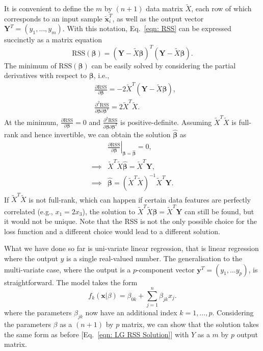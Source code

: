 It is convenient to define the $m$ by $(n+1)$ data matrix $\widetilde{X}$, each row of which corresponds to  an input sample $\bm{\tilde{x}}^{T}_{i}$, as well as the output vector $\bm{Y}^{T} = (y_{1}, \dots, y_{m})$. With this notation, Eq.~\eqref{eqn: RSS} can be expressed succinctly as a matrix equation
\begin{equation}
    \textrm{RSS}(\bm{\beta}) = (\bm{Y} - \widetilde{X}\bm{\beta})^{T}(\bm{Y} - \widetilde{X}\bm{\beta}).
    \end{equation}
The minimum of $\textrm{RSS}(\bm{\beta})$ can be easily solved by considering the partial derivatives with respect to $\bm{\beta}$, i.e.,
\begin{equation}
\begin{split}
  &\frac{\partial \textrm{RSS}}{\partial \bm{\beta}} = -2 \widetilde{X}^{T}(\bm{Y} - \widetilde{X}\bm{\beta}), \\
  &\frac{\partial^{2} \textrm{RSS}}{\partial \bm{\beta}\partial \bm{\beta}^{T}} = 2 \widetilde{X}^{T}\widetilde{X}.
\end{split}
\end{equation}
At the minimum, $\frac{\partial \textrm{RSS}}{\partial \bm{\beta}} = 0$ and $\frac{\partial^{2} \textrm{RSS}}{\partial \bm{\beta}\partial \bm{\beta}^{T}}$ is positive-definite. Assuming $ \widetilde{X}^{T}\widetilde{X}$ is full-rank and hence invertible, we can obtain the solution $\hat{\bm{\beta}}$ as 
\begin{equation}\label{eqn: LG RSS Solution}
\begin{split}
    &\left.\frac{\partial \textrm{RSS}}{\partial \bm{\beta}}\right|_{\bm{\beta}=\hat{\bm{\beta}}} = 0, \\
      \implies &\widetilde{X}^{T}\widetilde{X}\hat{\bm{\beta}} = \widetilde{X}^{T}\bm{Y}, \\
    \implies 
 & \hat{\bm{\beta} }=  (\widetilde{X}^{T}\widetilde{X})^{-1} \widetilde{X}^{T} \bm{Y}.
\end{split}
\end{equation}
If $ \widetilde{X}^{T}\widetilde{X}$ is not full-rank, which can happen if certain data features are perfectly correlated (e.g., $x_1 = 2x_3$), the solution to $\widetilde{X}^{T}\widetilde{X}\bm{\beta} = \widetilde{X}^{T}\bm{Y}$ can still be found, but it would not be unique. Note that the RSS is not the only possible choice for the loss function and a different choice would lead to a different solution.

What we have done so far is uni-variate linear regression, that is linear regression where the output $y$ is a single real-valued number. The generalisation to the multi-variate case, where the output is a $p$-component vector $\bm{y}^{T} = (y_1, \dots y_p)$, is straightforward. The model takes the form
\begin{equation} \label{eqn: Multivariate Linear Model}
    f_{k}(\bm{x}|\beta) = \beta_{0k} + \sum_{j=1}^{n} \beta_{jk}x_{j}.
\end{equation}
where the parameters $\beta_{jk}$ now have an additional index $k = 1, \dots, p$. Considering the parameters $\beta$ as a $(n+1)$ by $p$ matrix, we can show that the solution takes the same form as before [Eq.~\eqref{eqn: LG RSS Solution}] with $Y$ as a $m$ by $p$ output matrix.


